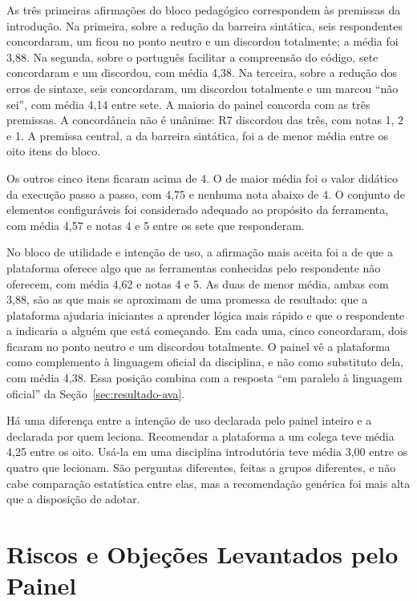 As três primeiras afirmações do bloco pedagógico correspondem às premissas da introdução. Na primeira, sobre a redução da barreira sintática, seis respondentes concordaram, um ficou no ponto neutro e um discordou totalmente; a média foi 3,88. Na segunda, sobre o português facilitar a compreensão do código, sete concordaram e um discordou, com média 4,38. Na terceira, sobre a redução dos erros de sintaxe, seis concordaram, um discordou totalmente e um marcou ``não sei'', com média 4,14 entre sete. A maioria do painel concorda com as três premissas. A concordância não é unânime: R7 discordou das três, com notas 1, 2 e 1. A premissa central, a da barreira sintática, foi a de menor média entre os oito itens do bloco.

Os outros cinco itens ficaram acima de 4. O de maior média foi o valor didático da execução passo a passo, com 4,75 e nenhuma nota abaixo de 4. O conjunto de elementos configuráveis foi considerado adequado ao propósito da ferramenta, com média 4,57 e notas 4 e 5 entre os sete que responderam.

No bloco de utilidade e intenção de uso, a afirmação mais aceita foi a de que a plataforma oferece algo que as ferramentas conhecidas pelo respondente não oferecem, com média 4,62 e notas 4 e 5. As duas de menor média, ambas com 3,88, são as que mais se aproximam de uma promessa de resultado: que a plataforma ajudaria iniciantes a aprender lógica mais rápido e que o respondente a indicaria a alguém que está começando. Em cada uma, cinco concordaram, dois ficaram no ponto neutro e um discordou totalmente. O painel vê a plataforma como complemento à linguagem oficial da disciplina, e não como substituto dela, com média 4,38. Essa posição combina com a resposta ``em paralelo à linguagem oficial'' da Seção~\ref{sec:resultado-ava}.

Há uma diferença entre a intenção de uso declarada pelo painel inteiro e a declarada por quem leciona. Recomendar a plataforma a um colega teve média 4,25 entre os oito. Usá-la em uma disciplina introdutória teve média 3,00 entre os quatro que lecionam. São perguntas diferentes, feitas a grupos diferentes, e não cabe comparação estatística entre elas, mas a recomendação genérica foi mais alta que a disposição de adotar.

\section{Riscos e Objeções Levantados pelo Painel}
\label{sec:resultado-riscos}

